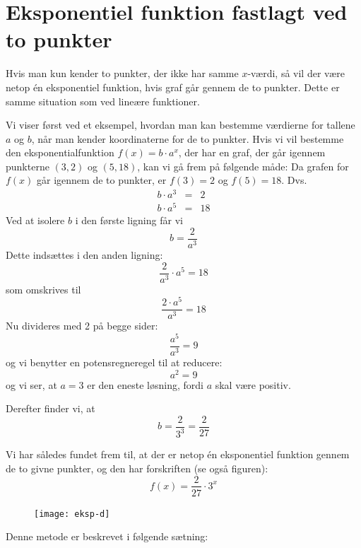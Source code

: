 \documentclass[12pt,oneside,a4paper]{article}
\newcommand{\bas}{\begin{eqnarray*}}
\newcommand{\eas}{\end{eqnarray*}}
\theoremstyle{plain}
\begin{document}
\section*{Eksponentiel funktion fastlagt ved to punkter}
Hvis man kun kender to punkter, der ikke har samme $x$-værdi, så vil der være
netop én eksponentiel funktion,
hvis graf går gennem de to punkter. Dette er samme situation som ved lineære
funktioner.

Vi viser først ved et eksempel, hvordan man kan bestemme værdierne for tallene
$a$ og $b$, når man kender koordinaterne for de to punkter.
Hvis vi vil bestemme den eksponentialfunktion $f(x) = b\cdot a^x$, der har en
graf, der går igennem punkterne $(3, 2)$ og $(5, 18)$, kan vi gå frem på
følgende måde:
Da grafen for $f(x)$ går igennem de to punkter, er $f(3) = 2$ og $f(5) = 18$. Dvs.
\bas
b \cdot a^3  &=& 2\\
b \cdot a^5  &=& 18
\eas
Ved at isolere $b$ i den første ligning får vi
$$
b = \frac{2}{a^3}
$$
Dette indsættes i den anden ligning:
$$
\frac{2}{a^3} \cdot a^5 = 18
$$
som omskrives til
$$
\frac{2 \cdot a^5}{a^3} = 18
$$
Nu divideres med 2 på begge sider:
$$
\frac{a^5}{a^3} = 9
$$
og vi benytter en potensregneregel til at reducere:
$$
a^2 = 9
$$
og vi ser, at $a=3$ er den eneste løsning, fordi $a$ skal være positiv.

Derefter finder vi, at 
$$
b = \frac{2}{3^3} = \frac{2}{27}
$$

Vi har således fundet frem til, at der er netop én eksponentiel funktion gennem
de to givne punkter, og den har forskriften (se også figuren):
$$
f(x) = \frac{2}{27} \cdot 3^x
$$

\begin{figure}[ht]
    \centering
    \texttt{[image: eksp-d]}
    \label{eksp-d}
\end{figure}

Denne metode er beskrevet i følgende sætning:
\end{document}
